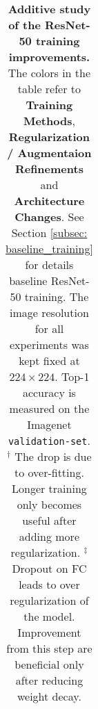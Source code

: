 \begin{table}[ht!]
\begin{center}
\begin{tabular}{l|cc|c}
      \bottomrule
    \end{tabular}
    \end{center}
    \vspace{-0.15cm}
    \caption{\textbf{Additive study of the ResNet-50 training improvements.} The colors in the table refer to \textbf{\colorbox{blue!15}{Training Methods}}, \textbf{\colorbox{green!20}{Regularization / Augmentaion Refinements}} and \textbf{\colorbox{yellow!20}{Architecture Changes}}. See Section \ref{subsec: baseline_training} for details baseline ResNet-50 training. The image resolution for all experiments was kept fixed at $224 \times 224$. Top-1 accuracy is measured on the Imagenet \texttt{validation-set}. $^{\dag}$ The drop is due to over-fitting. Longer training only becomes useful after adding more regularization. $^{\ddagger}$ Dropout on FC leads to over regularization of the model. Improvement from this step are beneficial only after reducing weight decay.
    }
    \label{tab:resnet_method_ablation}
    \end{table}


